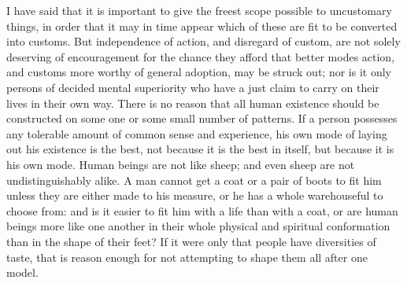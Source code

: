 \documentclass[11pt,openany]{book}
\begin{document}
I have said that it is important to give the freest scope possible to uncustomary things, in order that it may in time appear which of these are fit to be converted into customs. But independence of action, and disregard of custom, are not solely deserving of encouragement for the chance they afford that better modes action, and customs more worthy of general adoption, may be struck out; nor is it only persons of decided mental superiority who have a just claim to carry on their lives in their own way. There is no reason that all human existence should be constructed on some one or some small number of patterns. If a person possesses any tolerable amount of common sense and experience, his own mode of laying out his existence is the best, not because it is the best in itself, but because it is his own mode. Human beings are not like sheep; and even sheep are not undistinguishably alike. A man cannot get a coat or a pair of boots to fit him unless they are either made to his measure, or he has a whole warehouseful to choose from: and is it easier to fit him with a life than with a coat, or are human beings more like one another in their whole physical and spiritual conformation than in the shape of their feet? If it were only that people have diversities of taste, that is reason enough for not attempting to shape them all after one model.
\end{document}
